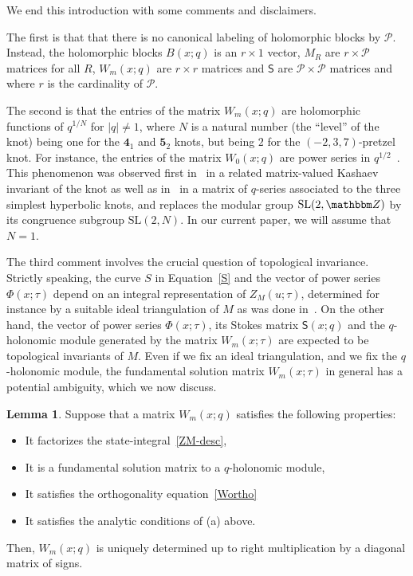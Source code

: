 \documentclass[12pt,reqno]{amsart}
\theoremstyle{definition}
\newtheorem{lemma}[theorem]{Lemma}
\def\BZ{\mathbbm Z}
\def\calP{\mathcal P}
\def\SL{\mathrm{SL}}
\def\md{\mathbf}
\def\ms{\mathsf}
\newcommand{\knot}[1]{\md{#1}}
\begin{document}
We end this introduction with some comments and disclaimers. 

The first is that that there is no canonical labeling of holomorphic
blocks by $\calP$. Instead, the holomorphic blocks $B(x;q)$ is an
$r \times 1$ vector, $M_R$ are $r \times \calP$ matrices for all $R$,
$W_m(x;q)$ are $r \times r$ matrices and $\ms{S}$ are
$\calP \times \calP$ matrices and where $r$ is the cardinality of
$\calP$.

The second is that the entries of the matrix $W_m(x;q)$ are
holomorphic functions of $q^{1/N}$ for $|q| \neq 1$, where $N$ is a
natural number (the ``level'' of the knot) being one for the
$\knot{4}_1$ and $\knot{5}_2$ knots, but being $2$ for the
$(-2,3,7)$-pretzel knot.  For instance, the entries of the matrix
$W_0(x;q)$ are power series in $q^{1/2}$~\cite{GZ:kashaev}.  This
phenomenon was observed first in~\cite{GZ:kashaev} in a related
matrix-valued Kashaev invariant of the knot as well as
in~\cite{GZ:qseries} in a matrix of $q$-series associated to the three
simplest hyperbolic knots, and replaces the modular group $\SL(2,\BZ)$
by its congruence subgroup $\SL(2,N)$. In our current paper, we will
assume that $N=1$.

The third comment involves the crucial question of topological invariance.
Strictly speaking, the curve $S$ in Equation~\eqref{S} and the vector
of power series $\Phi(x;\tau)$ depend on an integral representation of
$Z_M(u;\tau)$, determined for instance by a suitable ideal triangulation of
$M$ as was done in~\cite{AK}. On the other hand, the vector of power series
$\Phi(x;\tau)$, its Stokes matrix $\ms{S}(x;q)$ and the $q$-holonomic
module generated by the matrix $W_m(x;\tau)$ are expected to be topological
invariants of $M$. Even if we fix an ideal triangulation, and we fix the
$q$-holonomic module, the fundamental solution matrix $W_m(x;\tau)$ in
general has a potential ambiguity, which we now discuss.

\begin{lemma}
  \label{lem.Wamb}
  Suppose that a matrix $W_m(x;q)$ satisfies the following properties: 
  \begin{itemize}
  \item
    It factorizes the state-integral~\eqref{ZM-desc},
  \item
    It is a fundamental solution matrix to a $q$-holonomic module,
  \item
    It satisfies the orthogonality equation~\eqref{Wortho}
  \item
    It satisfies the analytic conditions of (a) above.
  \end{itemize}
  Then, $W_m(x;q)$ is uniquely determined up to right multiplication
  by a diagonal matrix of signs.
\end{lemma}
\end{document}
